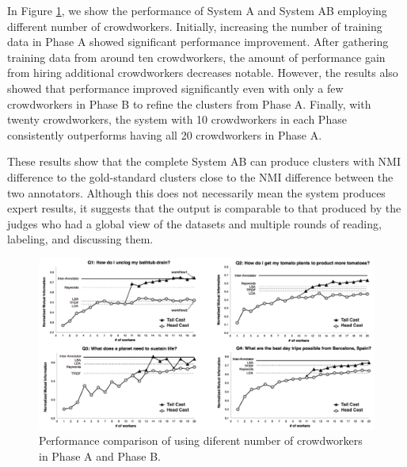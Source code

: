 In Figure \ref{fig:numberOfTurkers}, we show the performance of System A and
System AB employing different number of crowdworkers.  Initially, increasing the
number of training data in Phase A showed significant performance improvement.
After gathering training data from around ten crowdworkers, the amount of performance
gain from hiring additional crowdworkers decreases notable. However, the
results also showed that performance improved significantly even with only a few crowdworkers in Phase B to refine the clusters from Phase A. Finally,
with twenty crowdworkers, the system with 10 crowdworkers in each Phase
consistently outperforms having all 20 crowdworkers in Phase A.

These results show that the complete System AB can produce clusters with NMI
difference to the gold-standard clusters close to the NMI difference between
the two annotators. Although this does not necessarily mean the system produces
expert results, it suggests that the output is comparable to that produced
by the judges who had a global view of the datasets and multiple rounds of reading,
labeling, and discussing them.



\begin{figure}[!t]
	\centering
	\includegraphics[width=1\columnwidth]{images/numberOfTurkers.png}
	\caption{Performance comparison of using diferent number of crowdworkers in Phase A and Phase B.}
	\label{fig:numberOfTurkers}
\end{figure}

